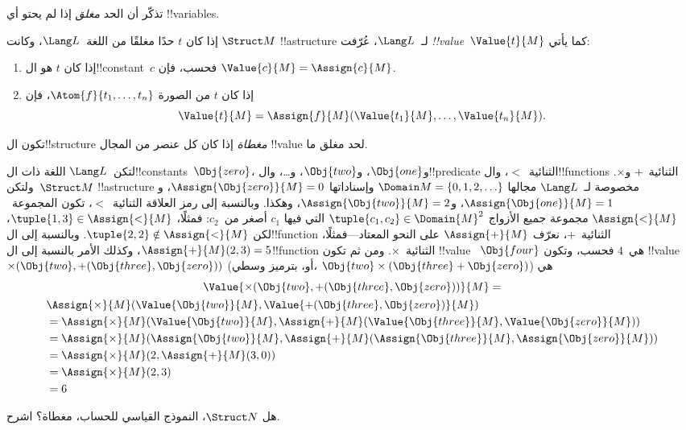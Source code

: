 \documentclass[../../../include/open-logic-section]{subfiles}
\begin{document}


\begin{explain}
تذكّر أن الحد \emph{مغلق} إذا لم يحتو أي !!{variable}s.
\end{explain}

\begin{defn}
إذا كان $t$ حدًا مغلقًا من اللغة~$\Lang L$، وكانت $\Struct M$
!!a{structure} لـ~$\Lang L$، عُرّفت \emph{!!{value}}~$\Value{t}{M}$
كما يأتي:
\begin{enumerate}
\item إذا كان $t$ هو ال!!{constant}~$c$ فحسب، فإن
  $\Value{c}{M} = \Assign{c}{M}$.
\item إذا كان $t$ من الصورة $\Atom{f}{t_1, \ldots, t_n}$، فإن
  \[
  \Value{t}{M} = \Assign{f}{M}(\Value{t_1}{M}, \ldots,
  \Value{t_n}{M}).
  \]
\end{enumerate}
\end{defn}

\begin{defn}
تكون ال!!{structure} \emph{مغطاة} إذا كان كل عنصر من المجال
!!{value} لحد مغلق ما.
\end{defn}

\begin{ex}
لتكن~$\Lang L$ اللغة ذات ال!!{constant}s~$\Obj{zero}$،
و$\Obj{one}$، و$\Obj{two}$، و\dots، وال!!{predicate} الثنائية~$<$،
وال!!{function}s الثنائية~$+$ و$\times$. ولتكن~$\Struct M$
!!a{structure} مخصوصة لـ~$\Lang L$ مجالها
$\Domain M = \{0, 1, 2, \ldots \}$ وإسناداتها
$\Assign{\Obj{zero}}{M} = 0$، و$\Assign{\Obj{one}}{M} = 1$،
و$\Assign{\Obj{two}}{M} = 2$، وهكذا. وبالنسبة إلى رمز العلاقة
الثنائية~$<$، تكون المجموعة~$\Assign{<}{M}$ مجموعة جميع الأزواج
$\tuple{c_1, c_2} \in \Domain{M}^2$ التي فيها $c_1$ أصغر
من~$c_2$: فمثلًا، $\tuple{1, 3} \in \Assign{<}{M}$، لكن
$\tuple{2, 2} \notin \Assign{<}{M}$. وبالنسبة إلى
ال!!{function} الثنائية~$+$، نعرّف $\Assign{+}{M}$ على النحو
المعتاد---فمثلًا، $\Assign{+}{M}(2,3)=5$، وكذلك الأمر بالنسبة إلى
ال!!{function} الثنائية~$\times$. ومن ثم تكون !!{value}
~$\Obj{four}$ هي~$4$ فحسب، وتكون !!{value}
~$\times(\Obj{two}, +(\Obj{three},\Obj{zero}))$ (أو، بترميز
وسطي، $\Obj{two} \times (\Obj{three} + \Obj{zero})$) هي
\begin{multline*}
\Value{\times(\Obj{two}, +(\Obj{three},\Obj{zero}))}{M} =\\
\begin{aligned}
& \Assign{\times}{M}(\Value{\Obj{two}}{M}, \Value{+(\Obj{three}, \Obj{zero})}{M})\\
& = \Assign{\times}{M}(\Value{\Obj{two}}{M}, \Assign{+}{M}(\Value{\Obj{three}}{M},
\Value{\Obj{zero}}{M})) \\
& = \Assign{\times}{M}(\Assign{\Obj{two}}{M}, \Assign{+}{M}(\Assign{\Obj{three}}{M},
\Assign{\Obj{zero}}{M})) \\
& = \Assign{\times}{M}(2, \Assign{+}{M}(3, 0)) \\
& = \Assign{\times}{M}(2, 3) \\
& = 6
\end{aligned}
\end{multline*}
\end{ex}

\begin{prob}
هل $\Struct N$، النموذج القياسي للحساب، مغطاة؟ اشرح.
\end{prob}
\end{document}
